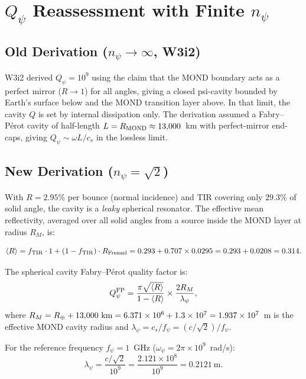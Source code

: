 \documentclass[aps,prd,twocolumn,superscriptaddress]{revtex4-2}
\newcommand{\Qpsi}{Q_\psi}
\newcommand{\ee}[1]{\times 10^{#1}}
\begin{document}
\section{$Q_\psi$ Reassessment with Finite $n_\psi$}
\label{sec:Qpsi}

\subsection{Old Derivation ($n_\psi \to \infty$, W3i2)}

W3i2 derived $\Qpsi = 10^9$ using the claim that the MOND boundary
acts as a perfect mirror ($R \to 1$) for all angles, giving a
closed psi-cavity bounded by Earth's surface below and the MOND
transition layer above.  In that limit, the cavity $Q$ is set by
internal dissipation only.  The derivation assumed a Fabry--P\'{e}rot
cavity of half-length $L = R_{\rm MOND} \approx 13{,}000$~km with
perfect-mirror end-caps, giving $\Qpsi \sim \omega L / c_s$ in the
lossless limit.

\subsection{New Derivation ($n_\psi = \sqrt{2}$)}

With $R = 2.95\%$ per bounce (normal incidence) and TIR covering
only $29.3\%$ of solid angle, the cavity is a \emph{leaky} spherical
resonator.  The effective mean reflectivity, averaged over all solid
angles from a source inside the MOND layer at radius $R_M$, is:

\begin{equation}
\langle R \rangle = f_{\rm TIR} \cdot 1 + (1 - f_{\rm TIR}) \cdot R_{\rm Fresnel}
= 0.293 + 0.707 \times 0.0295 = 0.293 + 0.0208 = 0.314.
\label{eq:R-avg}
\end{equation}

The spherical cavity Fabry--P\'{e}rot quality factor is:
\begin{equation}
\Qpsi^{\rm FP} = \frac{\pi\sqrt{\langle R\rangle}}{1 - \langle R\rangle}
\times \frac{2R_M}{\lambda_\psi},
\label{eq:Q-FP}
\end{equation}
where $R_M = R_\oplus + 13{,}000~{\rm km} = 6.371\ee6 + 1.3\ee7
= 1.937\ee7$~m is the effective MOND cavity radius and
$\lambda_\psi = c_s / f_\psi = (c/\sqrt{2})/f_\psi$.

For the reference frequency $f_\psi = 1$~GHz
($\omega_\psi = 2\pi \times 10^9$~rad/s):
\begin{equation}
\lambda_\psi = \frac{c/\sqrt{2}}{10^9}
= \frac{2.121\ee8}{10^9} = 0.2121~\text{m}.
\end{equation}
\end{document}
